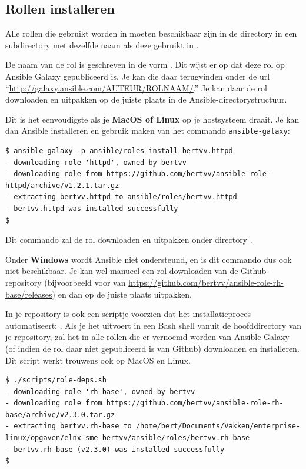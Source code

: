 \subsection{Rollen installeren}
\label{sub:rollen-installeren}

Alle rollen die gebruikt worden in  moeten beschikbaar zijn in de directory  in een subdirectory met dezelfde naam als deze gebruikt in .

De naam van de rol  is geschreven in de vorm . Dit wijst er op dat deze rol op Ansible Galaxy gepubliceerd is. Je kan die daar terugvinden onder de url ``\url{http://galaxy.ansible.com/AUTEUR/ROLNAAM/}.'' Je kan daar de rol downloaden en uitpakken op de juiste plaats in de Ansible-directorystructuur.

Dit is het eenvoudigste als je \textbf{MacOS of Linux} op je hostsysteem draait. Je kan dan Ansible installeren en gebruik maken van het commando \texttt{ansible-galaxy}:

\begin{verbatim}
$ ansible-galaxy -p ansible/roles install bertvv.httpd
- downloading role 'httpd', owned by bertvv
- downloading role from https://github.com/bertvv/ansible-role-httpd/archive/v1.2.1.tar.gz
- extracting bertvv.httpd to ansible/roles/bertvv.httpd
- bertvv.httpd was installed successfully
$
\end{verbatim}

Dit commando zal de rol  downloaden en uitpakken onder directory .

Onder \textbf{Windows} wordt Ansible niet ondersteund, en is dit commando dus ook niet beschikbaar. Je kan wel manueel een rol downloaden van de Github-repository (bijvoorbeeld voor  van \url{https://github.com/bertvv/ansible-role-rh-base/releases}) en dan op de juiste plaats uitpakken.

In je repository is ook een scriptje voorzien dat het installatieproces automatiseert: . Als je het uitvoert in een Bash shell vanuit de hoofddirectory van je repository, zal het in  alle rollen die er vernoemd worden van Ansible Galaxy (of indien de rol daar niet gepubliceerd is van Github) downloaden en installeren. Dit script werkt trouwens ook op MacOS en Linux.

\begin{verbatim}
$ ./scripts/role-deps.sh 
- downloading role 'rh-base', owned by bertvv
- downloading role from https://github.com/bertvv/ansible-role-rh-base/archive/v2.3.0.tar.gz
- extracting bertvv.rh-base to /home/bert/Documents/Vakken/enterprise-linux/opgaven/elnx-sme-bertvv/ansible/roles/bertvv.rh-base
- bertvv.rh-base (v2.3.0) was installed successfully
$ 
\end{verbatim}

